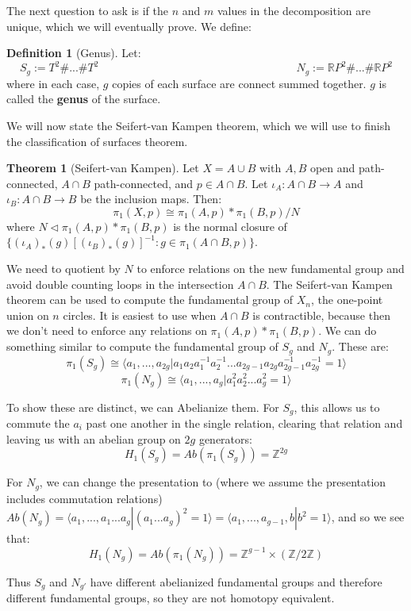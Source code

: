 \documentclass[11pt, oneside]{amsart}   	%
\theoremstyle{definition}
\newtheorem{definition}{Definition}[section]
\newtheorem{theorem}{Theorem}[section]
\begin{document}
	The next question to ask is if the $n$ and $m$ values in the decomposition are unique, which we will eventually prove. We define:
	
	\begin{definition}[Genus]
		Let:
		$$
			S_g := T^2\# ... \# T^2 \;\;\;\;\;\;\;\;\;\;\;\;\;\;\;\;\;\;\;\;\;\;\;\;\;\;\;\;\;\;\;\;\;\;\;\;\;\;\;\;\;\;\;\;\;\;\;\;\;\;\;\;\;\;\;\;\;\;\;\;\;\;\;\;
			N_g := \mathbb RP^2\# ... \#\mathbb RP^2
		$$
		where in each case, $g$ copies of each surface are connect summed together. $g$ is called the \textbf{genus} of the surface.
	\end{definition}
	
	We will now state the Seifert-van Kampen theorem, which we will use to finish the classification of surfaces theorem.
	
	\begin{theorem}[Seifert-van Kampen]
		Let $X = A\cup B$ with $A, B$ open and path-connected, $A\cap B$ path-connected, and $p\in A\cap B$. Let $\iota_A : A\cap B\rightarrow A$ and 
		$\iota_B : A\cap B\rightarrow B$ be the inclusion maps. Then:
		$$
			\pi_1(X, p)\cong\pi_1(A, p) * \pi_1(B, p) / N
		$$
		where $N\triangleleft\pi_1(A, p) * \pi_1(B, p)$ is the normal closure of $\{(\iota_A)_*(g)[(\iota_B)_*(g)]^{-1} : g\in \pi_1(A\cap B, p)\}$.
	\end{theorem}
	
	We need to quotient by $N$ to enforce relations on the new fundamental group and avoid double counting loops in the intersection $A\cap B$. The Seifert-van 
	Kampen theorem can be used to compute the fundamental group of $X_n$, the one-point union on $n$ circles. It is easiest to use when $A\cap B$ is 
	contractible, because then we don't need to enforce any relations on $\pi_1(A, p) * \pi_1(B, p)$. We can do something similar to compute the fundamental 
	group of $S_g$ and $N_g$. These are:
	$$
		\pi_1(S_g)\cong\langle a_1, ..., a_{2g} | a_1a_2a_1^{-1}a_2^{-1}...a_{2g - 1}a_{2g}a_{2g-1}^{-1}a_{2g}^{-1} = 1\rangle
	$$
	$$
		\pi_1(N_g)\cong\langle a_1, ..., a_g | a_1^2a_2^2...a_g^2 = 1\rangle
	$$
	
	To show these are distinct, we can Abelianize them. For $S_g$, this allows us to commute the $a_i$ past one another in the single relation, clearing that 
	relation and leaving us with an abelian group on $2g$ generators:
	$$
		H_1(S_g) = Ab(\pi_1(S_g))= \mathbb Z^{2g}
	$$
	
	For $N_g$, we can change the presentation to (where we assume the presentation includes commutation relations) $Ab(N_g) = \langle a_1, ..., a_1 ... a_g | 
	(a_1 ... a_g)^2 = 1\rangle = \langle a_1, ..., a_{g - 1}, b | b^2 = 1\rangle$, and so we see that:
	$$
		H_1(N_g) = Ab(\pi_1(N_g)) = \mathbb Z^{g - 1}\times (\mathbb Z / 2\mathbb Z)
	$$
	
	Thus $S_g$ and $N_{g'}$ have different abelianized fundamental groups and therefore different fundamental groups, so they are not homotopy equivalent. 
\end{document}
